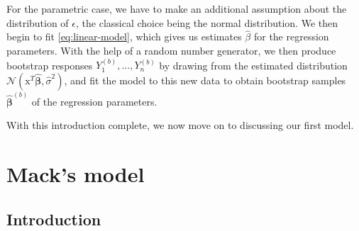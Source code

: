 \documentclass[a4paper]{book}
\begin{document}
For the parametric case, we have to make an additional assumption about the distribution of $\epsilon$, the classical choice being the normal distribution. We then begin to fit \cref{eq:linear-model}, which gives us estimates $\widehat{\beta}$ for the regression parameters. With the help of a random number generator, we then produce bootstrap responses $Y^{(b)}_1, \dots, Y^{(b)}_n$ by drawing from the estimated distribution $\mathcal{N}(\bm{\mathrm{x}}^T \widehat{\bm{\beta}}, \widehat{\sigma}^2)$, and fit the model to this new data to obtain bootstrap samples $\widehat{\bm{\beta}}^{(b)}$ of the regression parameters.

With this introduction complete, we now move on to discussing our first model.

\section{Mack's model} \label{sec:mack}

\subsection{Introduction} \label{subsec:mack-intro}
\end{document}
